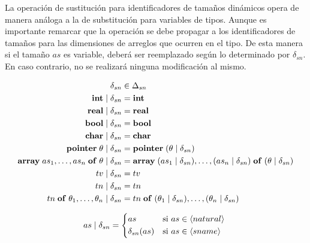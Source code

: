 La operación de sustitución para identificadores de tamaños dinámicos opera de manera análoga a la de substitución para variables de tipos. Aunque es importante remarcar que la operación se debe propagar a los identificadores de tamaños para las dimensiones de arreglos que ocurren en el tipo. De esta manera si el tamaño $as$ es variable, deberá ser reemplazado según lo determinado por $\delta_{sn}$.
En caso contrario, no se realizará ninguna modificación al mismo.

\begin{align*}
\delta_{sn}
&\in
\Delta_{sn}
\\
\mathbf{int} \mid \delta_{sn}
&=
\mathbf{int}
\\
\mathbf{real} \mid \delta_{sn}
&=
\mathbf{real}
\\
\mathbf{bool} \mid \delta_{sn}
&=
\mathbf{bool}
\\
\mathbf{char} \mid \delta_{sn}
&=
\mathbf{char}
\\
\mathbf{pointer} \; \theta \mid \delta_{sn}
&=
\mathbf{pointer} \; (\theta \mid \delta_{sn})
\\
\mathbf{array} \; as_1, \ldots, as_n \; \mathbf{of} \; \theta \mid \delta_{sn}
&=
\mathbf{array} \; (as_1 \mid \delta_{sn}), \ldots, (as_n \mid \delta_{sn}) \; \mathbf{of} \; (\theta \mid \delta_{sn})
\\
tv \mid \delta_{sn}
&=
tv
\\
tn \mid \delta_{sn}
&=
tn
\\
tn \; \mathbf{of} \; \theta_1, \ldots, \theta_n \mid \delta_{sn}
&=
tn \; \mathbf{of} \; (\theta_1 \mid \delta_{sn}), \ldots, (\theta_n \mid \delta_{sn})
\end{align*}

\begin{align*}
as \mid \delta_{sn} =
\begin{cases*}
as
&
si $as \in \NT{natural}$
\\
\delta_{sn}(as)
&
si $as \in \NT{sname}$
\end{cases*}
\end{align*}

